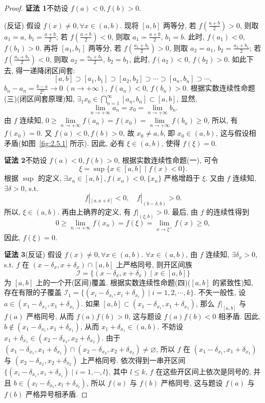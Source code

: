 \begin{proof}
\textbf{证法 1}\quad 不妨设 $f(a) < 0, f(b) > 0$.

(反证) 假设 $f(x) \neq 0, \forall x \in (a,b)$. 现将 $[a,b]$ 两等分, 若 $f\left(\frac{a+b}{2}\right) > 0$, 则取 $a_1 = a$, $b_1 = \frac{a+b}{2}$; 若 $f\left(\frac{a+b}{2}\right) < 0$, 则取 $a_1 = \frac{a+b}{2}$, $b_1 = b$. 此时, $f(a_1) < 0$, $f(b_1) > 0$. 再将 $[a_1,b_1]$ 两等分, 若 $f\left(\frac{a_1+b_1}{2}\right) > 0$, 则取 $a_2 = a_1$, $b_2 = \frac{a_1+b_1}{2}$; 若 $f\left(\frac{a_1+b_1}{2}\right) < 0$, 则取 $a_2 = \frac{a_1+b_1}{2}$, $b_2 = b_1$, 此时, $f(a_2) < 0$, $f(b_2) > 0$. 如此下去, 得一递降闭区间套:
\[
[a,b] \supset [a_1,b_1] \supset [a_2,b_2] \supset \cdots \supset [a_n,b_n] \supset \cdots,
\]
$b_n - a_n = \frac{b-a}{2^n} \to 0\ (n \to +\infty)$, $f(a_n) < 0$, $f(b_n) > 0$. 根据实数连续性命题(三)(闭区间套原理)知, $\exists_1 x_0 \in \bigcap\limits_{n=1}^{\infty}[a_n,b_n] \subset [a,b]$, 显然,
\[
\lim_{n \to +\infty} a_n = x_0 = \lim_{n \to +\infty} b_n.
\]
由 $f$ 连续知, $0 \geqslant \lim\limits_{n \to +\infty} f(a_n) = f(x_0) = \lim\limits_{n \to +\infty} f(b_n) \geqslant 0$, 所以, 有 $f(x_0) = 0$. 又 $f(a) < 0, f(b) > 0$, 故 $x_0 \neq a, b$, 即 $x_0 \in (a,b)$, 这与假设相矛盾(如图~\ref{fig:2.5.1} 所示). 因此, 必有 $\xi \in (a,b)$, 使得 $f(\xi) = 0$.

\textbf{证法 2}\quad 不妨设 $f(a) < 0, f(b) > 0$, 根据实数连续性命题(一), 可令
\[
\xi = \sup\{x \in [a,b] \mid f(x) < 0\}.
\]
根据 $\sup$ 的定义, $\exists x_n \in [a,b], f(x_n) < 0, \{x_n\}$ 严格增趋于 $\xi$. 又由 $f$ 连续知, $\exists \delta > 0$, s.t.
\[
f|_{[a,a+\delta]} < 0,\quad f|_{(b-\delta,b)} > 0.
\]
所以, $\xi \in (a,b)$. 再由上确界的定义, 有 $f|_{(\xi,b)} > 0$. 最后, 由 $f$ 的连续性得到
\[
0 \geqslant \lim_{n \to +\infty} f(x_n) = f(\xi) = \lim_{x \to \xi^+} f(x) \geqslant 0,
\]
因此, $f(\xi) = 0$.

\textbf{证法 3}\quad (反证) 假设 $f(x) \neq 0, \forall x \in (a,b)$. $\forall x \in (a,b)$, 由 $f$ 连续知, $\exists \delta_x > 0$, s.t. $f$ 在 $(x - \delta_x, x + \delta_x) \cap [a,b]$ 上严格同号, 则开区间族
\[
\mathcal{I} = \{(x - \delta_x, x + \delta_x) \mid x \in [a,b]\}
\]
为 $[a,b]$ 上的一个开(区间)覆盖. 根据实数连续性命题(四)($[a,b]$ 的紧致性)知, 存在有限的子覆盖 $\mathcal{I}_1 = \{(x_i - \delta_{x_i}, x_i + \delta_{x_i}) \mid i = 1, 2, \cdots, k\}$. 不失一般性, 设 $a \in (x_1 - \delta_{x_1}, x_1 + \delta_{x_1})$. 如果 $[a,b] \subset (x_1 - \delta_{x_1}, x_1 + \delta_{x_1})$, 那么 $f|_{[a,b]}$ 与 $f(a)$ 严格同号, 从而 $f(a)f(b) > 0$, 这与题设 $f(a)f(b) < 0$ 相矛盾. 因此, $b \notin (x_1 - \delta_{x_1}, x_1 + \delta_{x_1})$, 从而 $x_1 + \delta_{x_1} \in (a,b)$. 不妨设 $x_1 + \delta_{x_1} \in (x_2 - \delta_{x_2}, x_2 + \delta_{x_2})$. 由于 $(x_1 - \delta_{x_1}, x_1 + \delta_{x_1}) \cap (x_2 - \delta_{x_2}, x_2 + \delta_{x_2}) \neq \varnothing$, 所以 $f$ 在 $(x_1 - \delta_{x_1}, x_1 + \delta_{x_1})$ 与 $(x_2 - \delta_{x_2}, x_2 + \delta_{x_2})$ 上严格同号. 依次得到一串开区间 $\{(x_i - \delta_{x_i}, x_i + \delta_{x_i}) \mid i = 1, \cdots, l\}$, 其中 $l \leqslant k$, $f$ 在这些开区间上依次是同号的, 并且 $b \in (x_l - \delta_{x_l}, x_l + \delta_{x_l})$, 所以 $f(a)$ 与 $f(b)$ 严格同号, 这与题设 $f(a)$ 与 $f(b)$ 严格异号相矛盾.
\end{proof}

